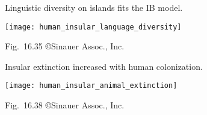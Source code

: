 \documentclass[t]{beamer}
\begin{document}
%
\begin{frame}{Linguistic diversity on islands fits the IB model.}
	\vspace{-\baselineskip}
	\begin{center}
		\texttt{[image: human\_insular\_language\_diversity]}
	\end{center}

	\vfilll
	
	\hfill \tiny Fig.~16.35 \copyright Sinauer Assoc., Inc.
\end{frame}
%
\begin{frame}{Insular extinction increased with human colonization.}
	\vspace{-0.5\baselineskip}
	\begin{center}
		\texttt{[image: human\_insular\_animal\_extinction]}
	\end{center}

	\vfilll

	\tiny Fig.~16.38 \copyright Sinauer Assoc., Inc.

\end{frame}
%
\end{document}
